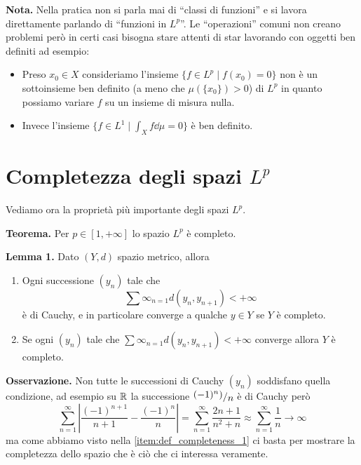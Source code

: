 \documentclass[a4paper, 12pt]{report}
\begin{document}
\textbf{Nota.}
Nella pratica non si parla mai di ``classi di funzioni'' e si lavora direttamente parlando di ``funzioni in $L^p$''. Le ``operazioni'' comuni non creano problemi però in certi casi bisogna stare attenti di star lavorando con oggetti ben definiti ad esempio:
\begin{itemize}
	\item Preso $x_0 \in X$ consideriamo l'insieme $\{ f \in L^p \mid f(x_0) = 0 \}$ non è un sottoinsieme ben definito (a meno che $\mu(\{ x_0 \}) > 0$) di $L^p$ in quanto possiamo variare $f$ su un insieme di misura nulla.

	\item Invece l'insieme $\{ f \in L^1 \mid \int_X f \dd \mu = 0 \}$ è ben definito.
\end{itemize}

\section{Completezza degli spazi $L^p$}

Vediamo ora la proprietà più importante degli spazi $L^p$.

\textbf{Teorema.}
Per $p \in [1, +\infty]$ lo spazio $L^p$ è completo.

\hypertarget{prop:completeness_lemma_1}{}
\textbf{Lemma 1.} 
Dato $(Y, d)$ spazio metrico, allora
\begin{enumerate}
	\item
		Ogni successione $(y_n)$ tale che
		$$
		\sum{\infty}_{n=1} d(y_n, y_{n+1}) < +\infty
		$$
		è di Cauchy, e in particolare converge a qualche $y \in Y$ se $Y$ è completo.

	\item \label{item:def_completeness_1}
		Se ogni $(y_n)$ tale che $\sum{\infty}_{n=1} d(y_n, y_{n+1}) < +\infty$ converge allora $Y$ è completo.	
\end{enumerate}

\textbf{Osservazione.} Non tutte le successioni di Cauchy $(y_n)$ soddisfano quella condizione, ad esempio su $\mathbb R$ la successione $\sfrac{(-1)^n)}{n}$ è di Cauchy però
$$
\sum_{n=1}^\infty \left| \frac{(-1)^{n+1}}{n+1} - \frac{(-1)^n}{n} \right| 
= \sum_{n=1}^\infty \frac{2n + 1}{n^2 + n}
\approx \sum_{n=1}^\infty \frac{1}{n} \to \infty
$$
ma come abbiamo visto nella \ref{item:def_completeness_1} ci basta per mostrare la completezza dello spazio che è ciò che ci interessa veramente.
\end{document}
